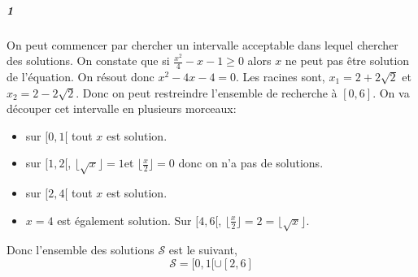 \documentclass[10pt,a4paper]{article}
\begin{document}
\subparagraph{1}On peut commencer par chercher un intervalle acceptable dans lequel chercher des solutions. On constate que si $\frac{x^2}{4}-x -1\ge 0$ alors $x$ ne peut pas être solution de l'équation. On résout donc $x^2-4x-4 = 0$. Les racines sont, $x_1 = 2 + 2\sqrt{2}$ et $x_2 = 2-2\sqrt{2}$. Donc on peut restreindre l'ensemble de recherche à $[0,6]$. On va découper cet intervalle en plusieurs morceaux:
\begin{itemize}
\item sur $[0,1[$ tout $x$ est solution.
\item sur $[1,2[$, $\lfloor \sqrt{x} \rfloor = 1$et $\lfloor \frac{x}{2} \rfloor = 0$ donc on n'a pas de solutions.
\item sur $[2,4[$ tout $x$ est solution.
\item $x=4$ est également solution. Sur $[4,6[$, $\lfloor \frac{x}{2} \rfloor = 2 = \lfloor \sqrt{x} \rfloor$. 
\end{itemize}
Donc l'ensemble des solutions $\mathcal{S}$ est le suivant,
\begin{equation}
\mathcal{S} = [0,1[ \cup [2,6]
\end{equation}
\end{document}
